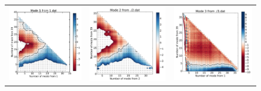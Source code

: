 	\begin{figure}[H]
		\begin{center}
			\begin{tabular}{c c c}
				\includegraphics{image/image/P1-F311} & \includegraphics{image/image/P1-F312} &\includegraphics{image/image/P1-F313} \\

\end{tabular}
\end{center}
\end{figure}
